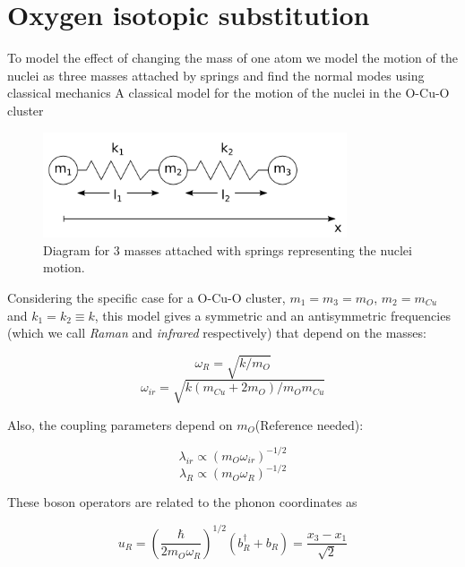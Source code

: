 \section{Oxygen isotopic substitution}

To model the effect of changing the mass of one atom we model the motion of the nuclei as three masses attached by springs and find the normal modes using classical mechanics A classical model for the motion of the nuclei in the O-Cu-O cluster

\begin{figure}[ht!]
\centering
\includegraphics[width=0.8\textwidth]{images/3-masses-2-springs-linear.png}
\caption{Diagram for 3 masses attached with springs representing the nuclei motion.}
\label{fig:3-mases-2-springs}
\end{figure}

Considering the specific case for a O-Cu-O cluster, $m_1=m_3=m_O$, $m_2=m_{Cu}$ and $k_1=k_2\equiv k$, this model gives a symmetric and an antisymmetric frequencies (which we call \textit{Raman} and \textit{infrared} respectively) that depend on the masses: 

\begin{equation}\label{eq:omegaR}
\omega_{R}= \sqrt{k/m_O}
\end{equation}
\begin{equation}\label{eq:omegair}
\omega_{ir} = \sqrt{k(m_{Cu}+2m_O)/m_Om_{Cu}}
\end{equation}

Also, the coupling parameters depend on $m_O$(Reference needed):

\begin{equation}\label{eq:ir-coupl-isot}
\lambda_{ir}\propto (m_O\omega_{ir})^{-1/2}
\end{equation}
\begin{equation}\label{eq:Ram-coupl-isot}
\lambda_R\propto (m_O\omega_{R})^{-1/2}
\end{equation}

These boson operators are related to the phonon coordinates as

\begin{equation}\label{eq:Ram-coord}
u_R = \left(\frac{\hbar}{2m_O \omega_R}\right)^{1/2}(b_R^\dagger + b_R) = \frac{x_3 - x_1}{\sqrt{2}}
\end{equation}

